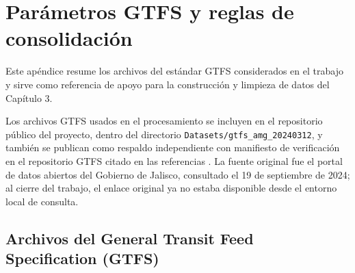 \appendix
\chapter{Parámetros GTFS y reglas de consolidación}
\label{ap:gtfs_files}

Este apéndice resume los archivos del estándar GTFS considerados en el trabajo
y sirve como referencia de apoyo para la construcción y limpieza de datos del
Capítulo 3.

Los archivos GTFS usados en el procesamiento se incluyen en el repositorio
público del proyecto, dentro del directorio \texttt{Datasets/gtfs\_amg\_20240312},
y también se publican como respaldo independiente con manifiesto de verificación
en el repositorio GTFS citado en las referencias \cite{betancourt_gtfs_amg2024}.
La fuente original fue el portal de datos abiertos del Gobierno de Jalisco,
consultado el 19 de septiembre de 2024; al cierre del trabajo, el enlace
original ya no estaba disponible desde el entorno local de consulta.

\section{Archivos del General Transit Feed Specification (GTFS)}

